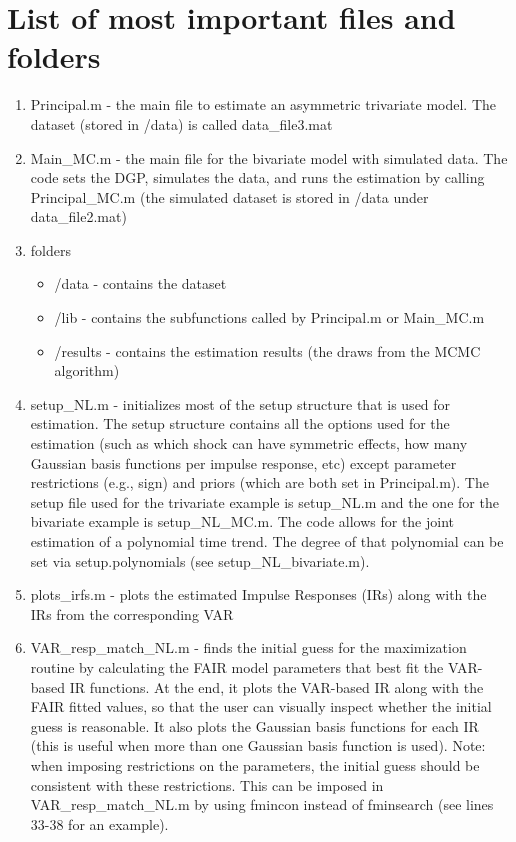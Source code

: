 \documentclass[a4paper,12pt]{article}
\begin{document}
\section{List of most important files and folders}
\begin{enumerate}
  \item Principal.m - the main file to estimate an asymmetric trivariate model. The dataset (stored in /data) is called data\_file3.mat
	\item Main\_MC.m - the main file for the bivariate model with simulated data. The code sets the DGP, simulates the data, and runs the estimation by calling Principal\_MC.m (the simulated dataset is stored in  /data under data\_file2.mat)
	
	\item folders
	\begin{itemize}
		\item /data - contains the dataset
		\item /lib - contains the subfunctions called by Principal.m or Main\_MC.m
		\item /results - contains the estimation results (the draws from the MCMC algorithm)
	\end{itemize}
	

  \item setup\_NL.m - initializes most of the setup structure that is used for estimation. The setup structure contains all the options used for the estimation (such as which shock can have symmetric effects, how many Gaussian basis functions per impulse response, etc) except parameter restrictions (e.g., sign) and priors (which are both set in Principal.m). The setup file used for the trivariate example is setup\_NL.m and the one for the bivariate example is setup\_NL\_MC.m. The code allows for the joint estimation of a polynomial time trend. The degree of that polynomial can be set via setup.polynomials (see setup\_NL\_bivariate.m). 
	
  \item plots\_irfs.m - plots the estimated Impulse Responses (IRs) along with the IRs from the corresponding VAR

  \item VAR\_resp\_match\_NL.m - finds the initial guess for the maximization routine by calculating the FAIR model parameters that best fit the VAR-based IR functions. At the end, it plots the VAR-based IR along with the FAIR fitted values, so that the user can visually inspect whether the initial guess is reasonable. It also plots the Gaussian basis functions for each IR (this is useful when more than one Gaussian basis function is used). Note: when imposing restrictions on the parameters, the initial guess should be consistent with these restrictions. This can be imposed in VAR\_resp\_match\_NL.m by using fmincon instead of fminsearch (see lines 33-38 for an example).
	
\end{enumerate}
\end{document}
